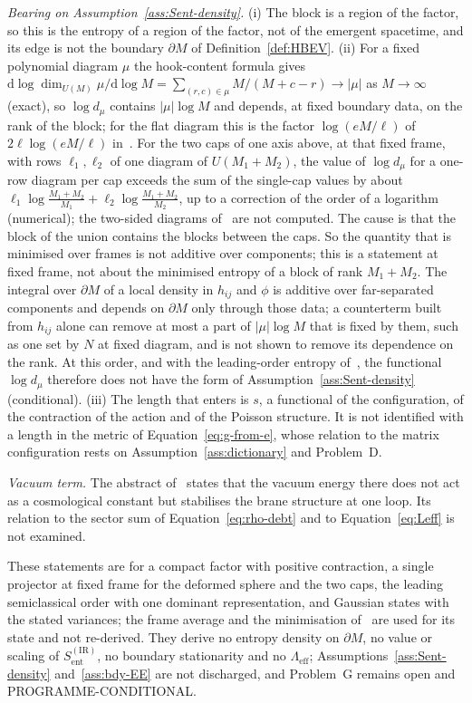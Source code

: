 \emph{Bearing on Assumption~\ref{ass:Sent-density}.} (i) The block is a region of the factor, so this is the entropy of a region of the factor, not of the emergent spacetime, and its edge is not the boundary \(\partial M\) of Definition~\ref{def:HBEV}. (ii) For a fixed polynomial diagram \(\mu\) the hook-content formula gives \(\mathrm d\log\dim_{U(M)}\mu/\mathrm d\log M=\sum_{(r,c)\in\mu}M/(M+c-r)\to|\mu|\) as \(M\to\infty\) (exact), so \(\log d_\mu\) contains \(|\mu|\log M\) and depends, at fixed boundary data, on the rank of the block; for the flat diagram this is the factor \(\log(eM/\ell)\) of \(2\ell\log(eM/\ell)\) in~\cite{FlissFrenkelHartnollSoni2025}. For the two caps of one axis above, at that fixed frame, with rows \(\ell_1,\ell_2\) of one diagram of \(U(M_1+M_2)\), the value of \(\log d_\mu\) for a one-row diagram per cap exceeds the sum of the single-cap values by about \(\ell_1\log\frac{M_1+M_2}{M_1}+\ell_2\log\frac{M_1+M_2}{M_2}\), up to a correction of the order of a logarithm (numerical); the two-sided diagrams of~\cite{FlissFrenkelHartnollSoni2025} are not computed. The cause is that the block of the union contains the blocks between the caps. So the quantity that is minimised over frames is not additive over components; this is a statement at fixed frame, not about the minimised entropy of a block of rank \(M_1+M_2\). The integral over \(\partial M\) of a local density in \(h_{ij}\) and \(\phi\) is additive over far-separated components and depends on \(\partial M\) only through those data; a counterterm built from \(h_{ij}\) alone can remove at most a part of \(|\mu|\log M\) that is fixed by them, such as one set by \(N\) at fixed diagram, and is not shown to remove its dependence on the rank. At this order, and with the leading-order entropy of~\cite{FlissFrenkelHartnollSoni2025}, the functional \(\log d_\mu\) therefore does not have the form of Assumption~\ref{ass:Sent-density} (conditional). (iii) The length that enters is \(s\), a functional of the configuration, of the contraction of the action and of the Poisson structure. It is not identified with a length in the metric of Equation~\eqref{eq:g-from-e}, whose relation to the matrix configuration rests on Assumption~\ref{ass:dictionary} and Problem~D.

\emph{Vacuum term.} The abstract of~\cite{Steinacker2023} states that the vacuum energy there does not act as a cosmological constant but stabilises the brane structure at one loop. Its relation to the sector sum of Equation~\eqref{eq:rho-debt} and to Equation~\eqref{eq:Leff} is not examined.

These statements are for a compact factor with positive contraction, a single projector at fixed frame for the deformed sphere and the two caps, the leading semiclassical order with one dominant representation, and Gaussian states with the stated variances; the frame average and the minimisation of~\cite{FlissFrenkelHartnollSoni2025} are used for its state and not re-derived. They derive no entropy density on \(\partial M\), no value or scaling of \(S_{\mathrm{ent}}^{\mathrm{(IR)}}\), no boundary stationarity and no \(\Lambda_{\mathrm{eff}}\); Assumptions~\ref{ass:Sent-density} and~\ref{ass:bdy-EE} are not discharged, and Problem~G remains open and PROGRAMME-CONDITIONAL.
